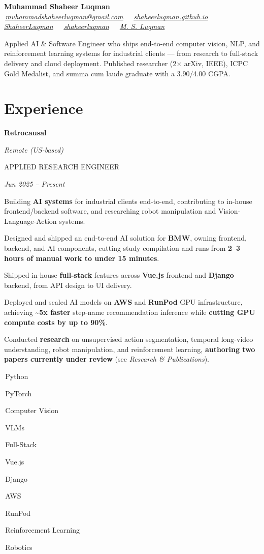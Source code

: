 \documentclass[10pt,a4paper]{article}
\let\orighref\href
\renewcommand{\href}[2]{\orighref{#1}{\uline{\textit{#2}}}}
\newlength{\datew}
\newlength{\entryskip}\setlength{\entryskip}{1pt}
\newcommand{\firstentry}{\vspace{3\entryskip}}
\newlength{\entrylocw}
\newcommand{\entrytoprow}[2]{%
  \noindent\begingroup
  \settowidth{\entrylocw}{\itshape #2}%
  \parbox[t]{\dimexpr\linewidth-\entrylocw-1em\relax}{\raggedright\bfseries\color{heading}#1}%
  \hfill
  \parbox[t]{\entrylocw}{\raggedleft\itshape\color{accent}#2}%
  \par\endgroup
}
\newcommand{\entrysubrow}[2]{%
  \noindent\begingroup
  \settowidth{\datew}{\itshape\small #2}%
  \parbox[t]{\dimexpr\linewidth-\datew-1em\relax}{\raggedright\small\color{muted}\MakeUppercase{#1}}%
  \hfill
  \parbox[t]{\datew}{\raggedleft\itshape\small\color{muted}#2}%
  \par\endgroup
}
\newcommand{\gridentry}[4]{%
  \par\vspace{-\parskip}\vspace{\entryskip}\vspace{-3pt}%
  \entrytoprow{#1}{#2}%
  \entrysubrow{#3}{#4}%
}
\newcommand{\chip}[1]{%
  \setlength{\fboxsep}{2pt}%
  \colorbox{chipbg}{\color{accentdk}\small\strut\,#1\,}\hspace{2pt}}
\begin{document}
\begin{center}
{\fontsize{26}{30}\selectfont\bfseries\color{accent}Muhammad Shaheer Luqman}\\[5pt]
{\footnotesize\color{heading}
\faEnvelope[regular]\,\href{mailto:muhammadshaheerluqman@gmail.com}{muhammadshaheerluqman@gmail.com}
~\textbar~\faHome\,\href{https://shaheerluqman.github.io/}{shaheerluqman.github.io}
~\textbar~\faGithub\,\href{https://github.com/ShaheerLuqman}{ShaheerLuqman}
~\textbar~\faLinkedin\,\href{http://linkedin.com/in/shaheerluqman}{shaheerluqman}
~\textbar~\faGraduationCap\,\href{https://scholar.google.com/citations?user=I3TSLaAAAAAJ&hl=en}{M. S. Luqman}
}
\end{center}

\vspace{2pt}
{\color{body}Applied AI \& Software Engineer who ships end-to-end computer vision, NLP, and reinforcement learning systems for industrial clients --- from research to full-stack delivery and cloud deployment. Published researcher (2$\times$ arXiv, IEEE), ICPC Gold Medalist, and summa cum laude graduate with a 3.90/4.00 CGPA.}


\section{Experience}
\firstentry
\gridentry{Retrocausal}{Remote (US-based)}{Applied Research Engineer}{Jun 2025 -- Present}
Building \textbf{AI systems} for industrial clients end-to-end, contributing to in-house frontend/backend
software, and researching robot manipulation and Vision-Language-Action systems.
\begin{tight}
  \item Designed and shipped an end-to-end AI solution for \textbf{BMW}, owning frontend, backend, and AI components, cutting study compilation and runs from \textbf{2--3 hours of manual work to under 15 minutes}.
  \item Shipped in-house \textbf{full-stack} features across \textbf{Vue.js} frontend and \textbf{Django} backend, from API design to UI delivery.
  \item Deployed and scaled AI models on \textbf{AWS} and \textbf{RunPod} GPU infrastructure, achieving \textbf{\textasciitilde5x faster} step-name recommendation inference while \textbf{cutting GPU compute costs by up to 90\%}.
  \item Conducted \textbf{research} on unsupervised action segmentation, temporal long-video understanding, robot manipulation, and reinforcement learning, \textbf{authoring two papers currently under review} (see \textit{Research \& Publications}).
\end{tight}
\vspace{2pt}
{\footnotesize\chip{Python}\chip{PyTorch}\chip{Computer Vision}\chip{VLMs}\chip{Full-Stack}\chip{Vue.js}\chip{Django}\chip{AWS}\chip{RunPod}\chip{Reinforcement Learning}\chip{Robotics}}
\end{document}
